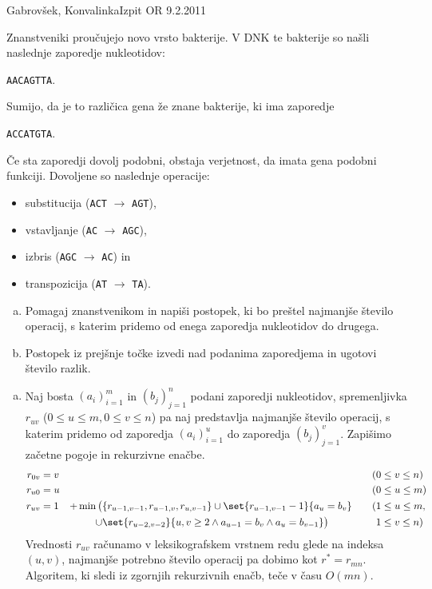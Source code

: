 \begin{naloga}{Gabrovšek, Konvalinka}{Izpit OR 9.2.2011}
\begin{vprasanje}
Znanstveniki proučujejo novo vrsto bakterije.
V DNK te bakterije so našli na\-sled\-nje zaporedje nukleotidov:
\begin{center}
{\tt AACAGTTA}.
\end{center}
Sumijo, da je to različica gena že znane bakterije, ki ima zaporedje
\begin{center}
{\tt ACCATGTA}.
\end{center}
Če sta zaporedji dovolj podobni,
obstaja verjetnost, da imata gena podobni funkciji.
Dovoljene so naslednje operacije:
\begin{itemize}
\item substitucija ({\tt ACT} $\to$ {\tt AGT}),
\item vstavljanje ({\tt AC} $\to$ {\tt AGC}),
\item izbris ({\tt AGC} $\to$ {\tt AC}) in
\item transpozicija ({\tt AT} $\to$ {\tt TA}).
\end{itemize}
\begin{enumerate}[(a)]
\item Pomagaj znanstvenikom in napiši postopek,
ki bo preštel najmanjše število operacij,
s katerim pridemo od enega zaporedja nukleotidov do drugega.
\item Postopek iz prejšnje točke izvedi nad podanima zaporedjema
in ugotovi število razlik.
\end{enumerate}
\end{vprasanje}

\begin{odgovor}
\begin{enumerate}[(a)]
\item Naj bosta $(a_i)_{i=1}^m$ in $(b_j)_{j=1}^n$
podani zaporedji nukleotidov,
spremenljivka $r_{uv}$ ($0 \le u \le m, 0 \le v \le n$)
pa naj predstavlja najmanjše število operacij,
s katerim pridemo od zaporedja $(a_i)_{i=1}^u$
do zaporedja $(b_j)_{j=1}^v$.
Zapišimo začetne pogoje in rekurzivne enačbe.
\begin{alignat*}{3}
r_{0v} &= v &&&\quad (0 &\le v \le n) \\
r_{u0} &= u &&&\quad (0 &\le u \le m) \\
r_{uv} &= 1 &+ \min\big(
&{} \{r_{u-1,v-1}, r_{u-1,v}, r_{u,v-1}\} \cup \set{r_{u-1,v-1} - 1}{a_u = b_v}
&\quad (1 &\le u \le m, \\
&& \cup &{} \set{r_{u-2,v-2}}{u, v \ge 2
                              \land a_{u-1} = b_v \land a_u = b_{v-1}}\big)
&\quad 1 &\le v \le n)
\end{alignat*}
Vrednosti $r_{uv}$ računamo v leksikografskem vrstnem redu
glede na indeksa $(u, v)$,
najmanjše potrebno število operacij pa dobimo kot $r^* = r_{mn}$.
Algoritem, ki sledi iz zgornjih rekurzivnih enačb, teče v času $O(mn)$.


\end{enumerate}
\end{odgovor}
\end{naloga}
